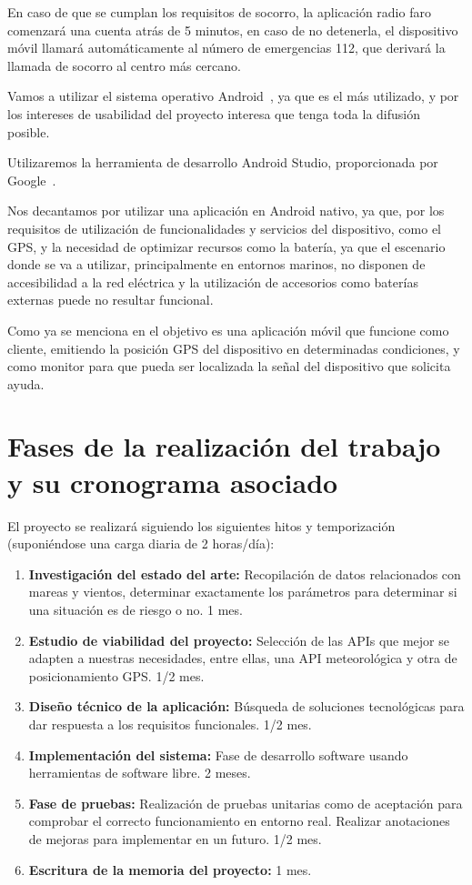 En caso de que se cumplan los requisitos de socorro, la aplicación radio faro comenzará una cuenta atrás de 5 minutos, en caso de no detenerla, el dispositivo móvil llamará automáticamente al número de emergencias 112, que derivará la llamada de socorro al centro más cercano.

Vamos a utilizar el sistema operativo Android~\cite{Android}, ya que es el más utilizado, y por los intereses de usabilidad del proyecto interesa que tenga toda la difusión posible.

Utilizaremos la herramienta de desarrollo Android Studio, proporcionada por Google~\cite{AS}.

Nos decantamos por utilizar una aplicación en Android nativo, ya que, por los requisitos de utilización de funcionalidades y servicios del dispositivo, como el GPS, y la necesidad de optimizar recursos como la batería, ya que el escenario donde se va a utilizar, principalmente en entornos marinos, no disponen de accesibilidad a la red eléctrica y la utilización de accesorios como baterías externas puede no resultar funcional.


Como ya se menciona en \cite{VRUIZ} el objetivo es una aplicación móvil que funcione como cliente, emitiendo la posición GPS del dispositivo en determinadas condiciones, y como monitor para que pueda ser localizada la señal del dispositivo que solicita ayuda.

\section{Fases de la realización del trabajo y su cronograma asociado}
El proyecto se realizará siguiendo los siguientes hitos y temporización (suponiéndose una carga diaria de 2 horas/día): 
\begin{enumerate}
\item  \textbf{Investigación del 
estado del arte:} Recopilación de datos 
relacionados con mareas y vientos, 
determinar exactamente los parámetros para
 determinar si una situación es de riesgo o no. 1 mes.
\item  \textbf{Estudio de viabilidad del proyecto:} Selección de las APIs que mejor se adapten a nuestras necesidades, entre ellas, una API meteorológica y otra de posicionamiento GPS. 1/2 mes.
\item  \textbf{Diseño técnico de la aplicación:} Búsqueda de soluciones tecnológicas para dar respuesta a los requisitos funcionales. 1/2 mes.
\item  \textbf{Implementación del sistema:} Fase de desarrollo software usando herramientas de software libre. 2 meses.
\item  \textbf{Fase de pruebas:} Realización de pruebas unitarias como de aceptación para comprobar el correcto funcionamiento en entorno real. Realizar anotaciones de mejoras para implementar en un futuro. 1/2 mes.
\item  \textbf{Escritura de la memoria del proyecto:} 1 mes.
\end{enumerate}


